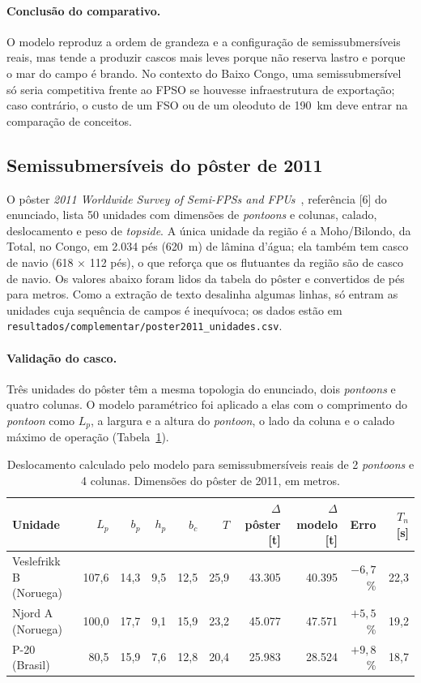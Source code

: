 \documentclass[11pt,a4paper]{article}
\begin{document}
\paragraph{Conclusão do comparativo.} O modelo reproduz a ordem de grandeza e a configuração de
semissubmersíveis reais, mas tende a produzir cascos mais leves porque não reserva lastro e porque
o mar do campo é brando. No contexto do Baixo Congo, uma semissubmersível só seria competitiva
frente ao FPSO se houvesse infraestrutura de exportação; caso contrário, o custo de um FSO ou de
um oleoduto de 190~km deve entrar na comparação de conceitos.


\subsection{Semissubmersíveis do pôster de 2011}

O pôster \emph{2011 Worldwide Survey of Semi-FPSs and FPUs}~\cite{poster}, referência [6] do
enunciado, lista 50 unidades com dimensões de \emph{pontoons} e colunas, calado, deslocamento e
peso de \emph{topside}. A única unidade da região é a Moho/Bilondo, da Total, no Congo, em 2.034
pés (620~m) de lâmina d'água; ela também tem casco de navio (618 × 112 pés), o que reforça que
os flutuantes da região são de casco de navio. Os valores abaixo foram lidos da tabela do pôster
e convertidos de pés para metros. Como a extração de texto desalinha algumas linhas, só entram as
unidades cuja sequência de campos é inequívoca; os dados estão em
\texttt{resultados/complementar/poster2011\_unidades.csv}.

\paragraph{Validação do casco.} Três unidades do pôster têm a mesma topologia do enunciado, dois
\emph{pontoons} e quatro colunas. O modelo paramétrico foi aplicado a elas com o comprimento do
\emph{pontoon} como $L_p$, a largura e a altura do \emph{pontoon}, o lado da coluna e o calado
máximo de operação (Tabela~\ref{tab:valposter}).

\begin{table}[H]
\centering
\caption{Deslocamento calculado pelo modelo para semissubmersíveis reais de 2 \emph{pontoons} e
4 colunas. Dimensões do pôster de 2011, em metros.}\label{tab:valposter}
\small
\begin{tabular}{lrrrrrrrrr}
\toprule
Unidade & $L_p$ & $b_p$ & $h_p$ & $b_c$ & $T$ & $\Delta$ pôster [t] & $\Delta$ modelo [t] & Erro & $T_n$ [s] \\
\midrule
Veslefrikk B (Noruega) & 107,6 & 14,3 & 9,5 & 12,5 & 25,9 & 43.305 & 40.395 & $-6{,}7$\% & 22,3 \\
Njord A (Noruega) & 100,0 & 17,7 & 9,1 & 15,9 & 23,2 & 45.077 & 47.571 & $+5{,}5$\% & 19,2 \\
P-20 (Brasil) & 80,5 & 15,9 & 7,6 & 12,8 & 20,4 & 25.983 & 28.524 & $+9{,}8$\% & 18,7 \\
\bottomrule
\end{tabular}
\end{table}
\end{document}

